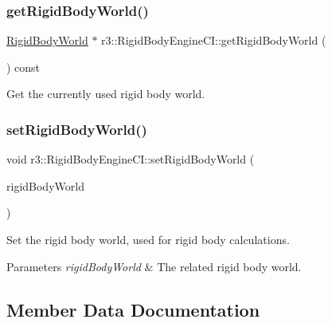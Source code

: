\subsubsection{\texorpdfstring{get\+Rigid\+Body\+World()}{getRigidBodyWorld()}}
{\footnotesize\ttfamily \mbox{\hyperlink{classr3_1_1_rigid_body_world}{Rigid\+Body\+World}} $\ast$ r3\+::\+Rigid\+Body\+Engine\+C\+I\+::get\+Rigid\+Body\+World (\begin{DoxyParamCaption}{ }\end{DoxyParamCaption}) const}



Get the currently used rigid body world. 

\mbox{\label{classr3_1_1_rigid_body_engine_c_i_a6787623e1862550ce04f1d970375b0ce}} 
\subsubsection{\texorpdfstring{set\+Rigid\+Body\+World()}{setRigidBodyWorld()}}
{\footnotesize\ttfamily void r3\+::\+Rigid\+Body\+Engine\+C\+I\+::set\+Rigid\+Body\+World (\begin{DoxyParamCaption}\item[{\mbox{\hyperlink{classr3_1_1_rigid_body_world}{Rigid\+Body\+World}} $\ast$}]{rigid\+Body\+World }\end{DoxyParamCaption})}



Set the rigid body world, used for rigid body calculations. 


\begin{DoxyParams}{Parameters}
{\em rigid\+Body\+World} & The related rigid body world. \\
\hline
\end{DoxyParams}


\subsection{Member Data Documentation}
\mbox{\label{classr3_1_1_rigid_body_engine_c_i_adb37ed2c686594f9504680be76c2dcbc}} 
